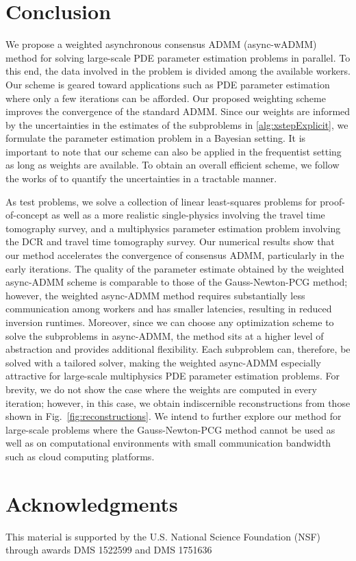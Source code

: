 \documentclass[11pt]{article}          %
\begin{document}
\section{Conclusion} \label{sec:conclusion} 
We propose a weighted asynchronous consensus ADMM (async-wADMM) method for solving large-scale PDE parameter estimation problems in parallel.
To this end, the data involved in the problem is divided among the available workers. 
Our scheme is geared toward applications such as PDE parameter estimation where only a few iterations can be afforded. 
Our proposed weighting scheme improves the convergence of the standard ADMM. 
Since our weights are informed by the uncertainties in the estimates of the subproblems in \eqref{alg:xstepExplicit}, we formulate the parameter estimation problem in a Bayesian setting. It is important to note that our scheme can also be applied in the frequentist setting as long as weights are available.  To obtain an overall efficient scheme, we follow the works of \cite{flath2011fast} to quantify the uncertainties in a tractable manner.  


As test problems, we solve a collection of linear least-squares problems for proof-of-concept as well as a more realistic single-physics involving the travel time tomography survey, and a multiphysics parameter estimation problem involving the DCR and travel time tomography survey.
Our numerical results show that our method accelerates the convergence of consensus ADMM, particularly in the early iterations.
The quality of the parameter estimate obtained by the weighted async-ADMM scheme is comparable to those of the Gauss-Newton-PCG method; however, the weighted async-ADMM method requires substantially less communication among workers and has smaller latencies, resulting in reduced inversion runtimes. Moreover, since we can choose any optimization scheme to solve the subproblems in async-ADMM, the method sits at a higher level of abstraction and provides additional flexibility. Each subproblem can, therefore, be solved with a tailored solver, making the weighted async-ADMM especially attractive for large-scale multiphysics PDE parameter estimation problems.
For brevity, we do not show the case where the weights are computed in every iteration; however, in this case, we obtain indiscernible reconstructions from those shown in Fig.~\ref{fig:reconstructions}. We intend to further explore our method for large-scale problems where the Gauss-Newton-PCG method cannot be used as well as on computational environments with small communication bandwidth such as cloud computing platforms.

\section*{Acknowledgments}
This material is supported by the U.S. National Science Foundation (NSF) through awards DMS 1522599 and DMS 1751636

\FloatBarrier


\end{document}

